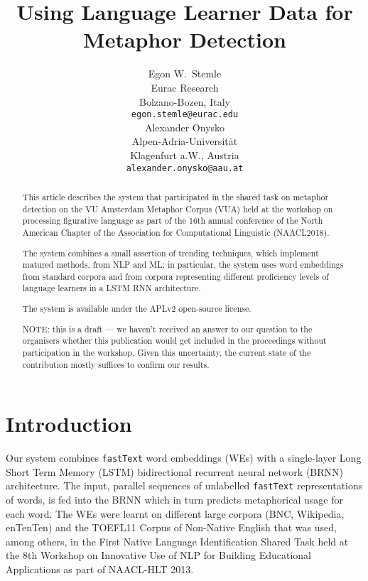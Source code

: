 \documentclass[11pt,a4paper]{article}
\title{Using Language Learner Data for Metaphor Detection}
\author{Egon W.~Stemle \\
  Eurac Research \\ 
  Bolzano-Bozen, Italy \\
  {\tt egon.stemle@eurac.edu} \\\And
  Alexander Onysko \\
  Alpen-Adria-Universität \\
  Klagenfurt a.W., Austria \\
  {\tt alexander.onysko@aau.at} \\}
\date{}
\newcommand\fT{\texttt{fastText}\xspace}
\begin{document}
\maketitle
\begin{abstract}
This article describes the system that participated in the shared task on metaphor detection on the VU Amsterdam Metaphor Corpus (VUA) held at the workshop on processing figurative language as part of the 16th annual conference of the North American Chapter of the Association for Computational Linguistic (NAACL2018).

The system combines a small assertion of trending techniques, which implement matured methods, from NLP and ML; in particular, the system uses word embeddings from standard corpora and from corpora representing different proficiency levels of language learners in a LSTM RNN architecture.

The system is available under the APLv2 open-source license.

NOTE: this is a draft --- we haven't received an answer to our question to the organisers whether this publication would get included in the proceedings without participation in the workshop. Given this uncertainty, the current state of the contribution mostly suffices to confirm our results.

\end{abstract}


\section{Introduction%
} %
\label{sec:intro}


Our system combines \fT \cite{bojanowski2016enriching} word embeddings (WEs) with a
single-layer Long Short Term Memory (LSTM) bidirectional recurrent neural network (BRNN)
architecture.
The input, parallel sequences of unlabelled \fT representations of words, is fed into the
BRNN which in turn predicts metaphorical usage for each word. The WEs were learnt on different large corpora (BNC, Wikipedia, enTenTen) and the TOEFL11 Corpus of Non-Native English\cite{ETS2:ETS202331} that was used, among others, in the First Native Language Identification Shared Task\cite{tetreault-blanchard-cahill:2013:BEA}
 held at the 8th Workshop on Innovative Use of NLP for Building Educational Applications as part of NAACL-HLT 2013.
\end{document}
